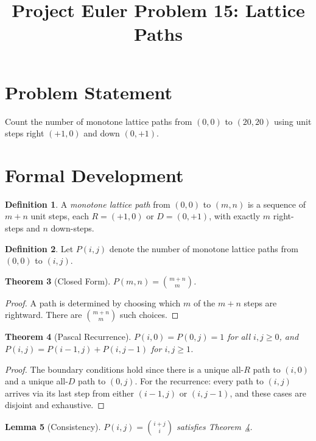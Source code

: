 \documentclass[12pt]{article}
\title{Project Euler Problem 15: Lattice Paths}
\author{}
\date{}
\newtheorem{theorem}{Theorem}
\newtheorem{lemma}[theorem]{Lemma}
\theoremstyle{definition}
\newtheorem{definition}[theorem]{Definition}
\theoremstyle{remark}
\begin{document}
\maketitle

\section{Problem Statement}

Count the number of monotone lattice paths from $(0,0)$ to $(20,20)$ using unit steps right $(+1,0)$ and down $(0,+1)$.

\section{Formal Development}

\begin{definition}
A \emph{monotone lattice path} from $(0,0)$ to $(m,n)$ is a sequence of $m+n$ unit steps, each $R = (+1,0)$ or $D = (0,+1)$, with exactly $m$ right-steps and $n$ down-steps.
\end{definition}

\begin{definition}
Let $P(i,j)$ denote the number of monotone lattice paths from $(0,0)$ to $(i,j)$.
\end{definition}

\begin{theorem}[Closed Form]
\label{thm:closed}
$P(m,n) = \binom{m+n}{m}$.
\end{theorem}

\begin{proof}
A path is determined by choosing which $m$ of the $m+n$ steps are rightward. There are $\binom{m+n}{m}$ such choices.
\end{proof}

\begin{theorem}[Pascal Recurrence]
\label{thm:pascal}
$P(i,0) = P(0,j) = 1$ for all $i, j \ge 0$, and $P(i,j) = P(i-1,j) + P(i,j-1)$ for $i, j \ge 1$.
\end{theorem}

\begin{proof}
The boundary conditions hold since there is a unique all-$R$ path to $(i,0)$ and a unique all-$D$ path to $(0,j)$. For the recurrence: every path to $(i,j)$ arrives via its last step from either $(i-1,j)$ or $(i,j-1)$, and these cases are disjoint and exhaustive.
\end{proof}

\begin{lemma}[Consistency]
\label{lem:consist}
$P(i,j) = \binom{i+j}{i}$ satisfies Theorem~\ref{thm:pascal}.
\end{lemma}
\end{document}
